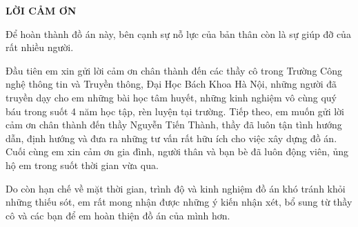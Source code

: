 \documentclass[../DoAn.tex]{subfiles}
\begin{document}
\begin{center}
    \Large{\textbf{LỜI CẢM ƠN}}\\
\end{center}
\vspace{1cm}

Để hoàn thành đồ án này, bên cạnh sự nỗ lực của bản thân còn là sự giúp đỡ của rất nhiều người.

Đầu tiên em xin gửi lời cảm ơn chân thành đến các thầy cô trong Trường Công nghệ thông tin và Truyền thông, Đại Học Bách Khoa Hà Nội, những người đã truyền dạy cho em những bài học tâm huyết, những kinh nghiệm vô cùng quý báu trong suốt 4 năm học tập, rèn luyện tại trường. Tiếp theo, em muốn gửi lời cảm ơn chân thành đến thầy Nguyễn Tiến Thành, thầy đã luôn tận tình hướng dẫn, định hướng và đưa ra những tư vấn rất hữu ích cho việc xây dựng đồ án. Cuối cùng em xin cảm ơn gia đình, người thân và bạn bè đã luôn động viên, ủng hộ em trong suốt thời gian vừa qua.

Do còn hạn chế về mặt thời gian, trình độ và kinh nghiệm đồ án khó tránh khỏi những thiếu sót, em rất mong nhận được những ý kiến nhận xét, bổ sung từ thầy cô và các bạn để em hoàn thiện đồ án của mình hơn. 
\end{document}
